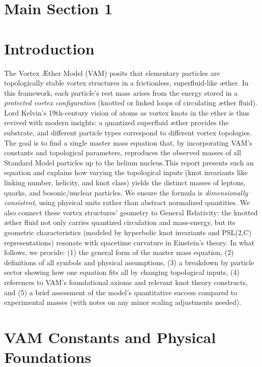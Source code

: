 \section*{Main Section 1}

\section*{Introduction}

The Vortex Æther Model (VAM) posits that elementary particles are topologically stable vortex structures in a frictionless, superfluid-like æther. In this framework, each particle’s rest mass arises from the energy stored in a \textit{protected vortex configuration} (knotted or linked loops of circulating æther fluid). Lord Kelvin’s 19th-century vision of atoms as vortex knots in the ether is thus revived with modern insights: a quantized superfluid æther provides the substrate, and different particle types correspond to different vortex topologies. The goal is to find a single master mass equation that, by incorporating VAM’s constants and topological parameters, reproduces the observed masses of all Standard Model particles up to the helium nucleus.This report presents such an equation and explains how varying the topological inputs (knot invariants like linking number, helicity, and knot class) yields the distinct masses of leptons, quarks, and bosonic/nuclear particles. We ensure the formula is \textit{dimensionally consistent}, using physical units rather than abstract normalized quantities. We also connect these vortex structures’ geometry to General Relativity: the knotted æther fluid not only carries quantized circulation and mass-energy, but its geometric characteristics (modeled by hyperbolic knot invariants and PSL(2,C) representations) resonate with spacetime curvature in Einstein’s theory. In what follows, we provide: (1) the general form of the master mass equation, (2) definitions of all symbols and physical assumptions, (3) a breakdown by particle sector showing how one equation fits all by changing topological inputs, (4) references to VAM’s foundational axioms and relevant knot theory constructs, and (5) a brief assessment of the model’s quantitative success compared to experimental masses (with notes on any minor scaling adjustments needed).\section*{VAM Constants and Physical Foundations}

